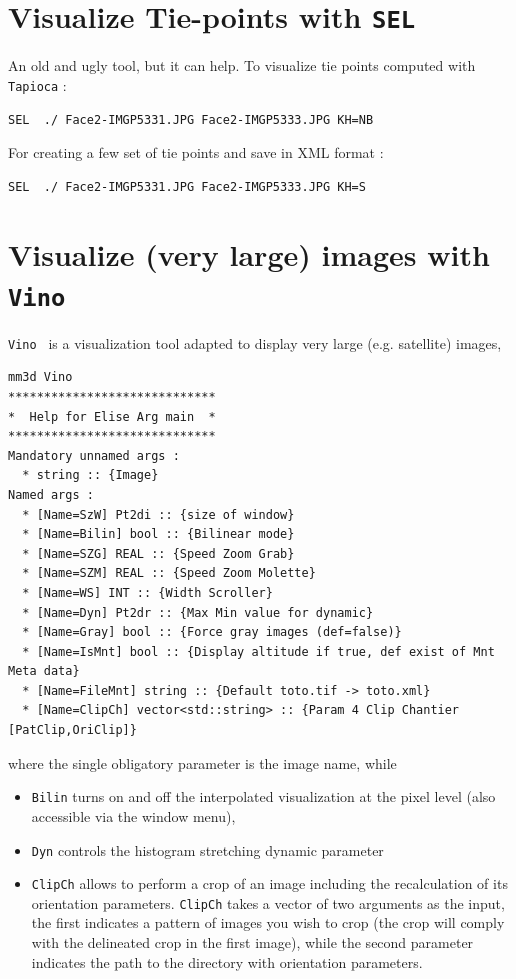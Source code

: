 
\section{Visualize Tie-points with {\tt SEL}}

An old and ugly tool, but it can help. To visualize tie points computed with
{\tt Tapioca} :

\begin{verbatim}
SEL  ./ Face2-IMGP5331.JPG Face2-IMGP5333.JPG KH=NB
\end{verbatim}

For creating a few set of tie points and save in XML format :

\begin{verbatim}
SEL  ./ Face2-IMGP5331.JPG Face2-IMGP5333.JPG KH=S
\end{verbatim}

\section{Visualize (very large) images with {\tt Vino}}\label{SEC:Vino}
%
{\tt Vino } is a visualization tool adapted to display very large (e.g. satellite) images, 


\begin{verbatim}
mm3d Vino
*****************************
*  Help for Elise Arg main  *
*****************************
Mandatory unnamed args : 
  * string :: {Image}
Named args : 
  * [Name=SzW] Pt2di :: {size of window}
  * [Name=Bilin] bool :: {Bilinear mode}
  * [Name=SZG] REAL :: {Speed Zoom Grab}
  * [Name=SZM] REAL :: {Speed Zoom Molette}
  * [Name=WS] INT :: {Width Scroller}
  * [Name=Dyn] Pt2dr :: {Max Min value for dynamic}
  * [Name=Gray] bool :: {Force gray images (def=false)}
  * [Name=IsMnt] bool :: {Display altitude if true, def exist of Mnt Meta data}
  * [Name=FileMnt] string :: {Default toto.tif -> toto.xml}
  * [Name=ClipCh] vector<std::string> :: {Param 4 Clip Chantier [PatClip,OriClip]}

\end{verbatim}
\noindent
where the single obligatory parameter is the image name, while
\begin{itemize}
\item {\tt Bilin} turns on and off the interpolated visualization at the pixel level (also accessible via the window menu),
\item {\tt Dyn} controls the histogram stretching dynamic parameter
\item {\tt ClipCh} allows to perform a crop of an image including the recalculation of its orientation parameters. {\tt ClipCh}  takes a vector of two arguments as the input, the first indicates a pattern of images you wish to crop (the crop will comply with the delineated crop in the first image), while the second parameter indicates the path to the directory with orientation parameters.
\end{itemize}

